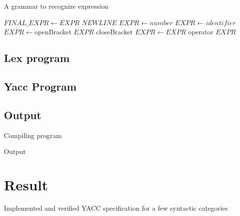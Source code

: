 \begin{algorithm}[H]
	\caption{A grammar to recognize expression}
	\begin{algorithmic}[1]
		\State $FINAL\_EXPR \gets EXPR$ $NEWLINE$
		\State $EXPR \gets number$
		\State $EXPR \gets identifier$
		\State $EXPR \gets $openBracket $EXPR$ closeBracket
		\State $EXPR \gets EXPR$ operator $EXPR$
	\end{algorithmic}
\end{algorithm}

\subsection{Lex program}

\subsection{Yacc Program}

\subsection{Output}
Compiling program



\vspace{0.5cm}
Output




\section{Result}
Implemented and verified YACC specification for a few syntactic categories